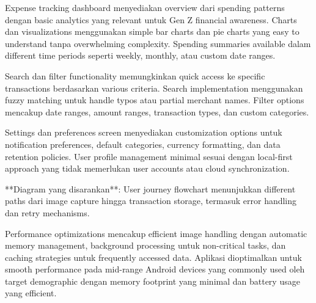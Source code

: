 Expense tracking dashboard menyediakan overview dari spending patterns dengan basic analytics yang relevant untuk Gen Z financial awareness. Charts dan visualizations menggunakan simple bar charts dan pie charts yang easy to understand tanpa overwhelming complexity. Spending summaries available dalam different time periods seperti weekly, monthly, atau custom date ranges.

Search dan filter functionality memungkinkan quick access ke specific transactions berdasarkan various criteria. Search implementation menggunakan fuzzy matching untuk handle typos atau partial merchant names. Filter options mencakup date ranges, amount ranges, transaction types, dan custom categories.

Settings dan preferences screen menyediakan customization options untuk notification preferences, default categories, currency formatting, dan data retention policies. User profile management minimal sesuai dengan local-first approach yang tidak memerlukan user accounts atau cloud synchronization.

**Diagram yang disarankan**: User journey flowchart menunjukkan different paths dari image capture hingga transaction storage, termasuk error handling dan retry mechanisms.

Performance optimizations mencakup efficient image handling dengan automatic memory management, background processing untuk non-critical tasks, dan caching strategies untuk frequently accessed data. Aplikasi dioptimalkan untuk smooth performance pada mid-range Android devices yang commonly used oleh target demographic dengan memory footprint yang minimal dan battery usage yang efficient.
